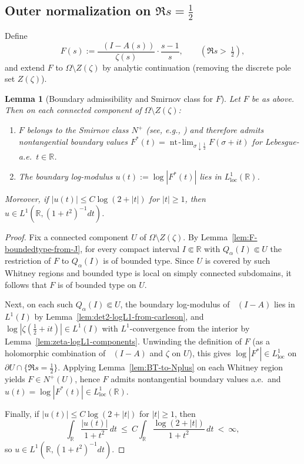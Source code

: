 \documentclass[11pt]{amsart}
\newtheorem{lemma}[theorem]{Lemma}
\theoremstyle{definition}
\theoremstyle{remark}
\DeclareMathOperator{\dettwo}{det_2}
\DeclareMathOperator{\ntlim}{nt\!-\!lim}
\begin{document}
\subsection*{Outer normalization on $\Re s=\tfrac12$}
Define
\[
  F(s):=\frac{\dettwo(I-A(s))}{\zeta(s)}\cdot\frac{s-1}{s},\qquad (\Re s>\>\tfrac12),
\]
and extend $F$ to $\Omega\setminus Z(\zeta)$ by analytic continuation (removing the discrete pole set $Z(\zeta)$).
\begin{lemma}[Boundary admissibility and Smirnov class for $F$]\label{lem:F-boundary-admissible}
Let $F$ be as above. Then on each connected component of $\Omega\setminus Z(\zeta)$:
\begin{enumerate}
\item $F$ belongs to the Smirnov class $N^+$ (see, e.g., \cite[Ch.~10]{DurenHp}) and therefore admits nontangential boundary values
$F^*(t)=\ntlim_{\sigma\downarrow \tfrac12}F(\sigma+it)$ for Lebesgue-a.e.\ $t\in\mathbb R$.
\item The boundary log-modulus $u(t):=\log|F^*(t)|$ lies in $L^1_{\mathrm{loc}}(\mathbb R)$.
\end{enumerate}
Moreover, if $|u(t)|\le C\log(2+|t|)$ for $|t|\ge 1$, then $u\in L^1(\mathbb R,(1+t^2)^{-1}dt)$.
\end{lemma}
\begin{proof}
Fix a connected component $U$ of $\Omega\setminus Z(\zeta)$. By Lemma~\ref{lem:F-boundedtype-from-J}, for every compact interval
$I\Subset\mathbb R$ with $Q_\alpha(I)\Subset U$ the restriction of $F$ to $Q_\alpha(I)$ is of bounded type.
Since $U$ is covered by such Whitney regions and bounded type is local on simply connected subdomains, it follows that $F$ is of bounded type on $U$.

Next, on each such $Q_\alpha(I)\Subset U$, the boundary log-modulus of $\dettwo(I-A)$ lies in $L^1(I)$ by Lemma~\ref{lem:det2-logL1-from-carleson},
and $\log|\zeta(\tfrac12+it)|\in L^1(I)$ with $L^1$-convergence from the interior by Lemma~\ref{lem:zeta-logL1-components}.
Unwinding the definition of $F$ (as a holomorphic combination of $\dettwo(I-A)$ and $\zeta$ on $U$), this gives $\log|F^*|\in L^1_{\mathrm{loc}}$ on $\partial U\cap\{\Re s=\tfrac12\}$.
Applying Lemma~\ref{lem:BT-to-Nplus} on each Whitney region yields $F\in N^+(U)$, hence $F$ admits nontangential boundary values a.e.\ and
$u(t)=\log|F^*(t)|\in L^1_{\mathrm{loc}}(\mathbb R)$.

Finally, if $|u(t)|\le C\log(2+|t|)$ for $|t|\ge 1$, then
\[
\int_{\mathbb R}\frac{|u(t)|}{1+t^2}\,dt \ \le\ C\int_{\mathbb R}\frac{\log(2+|t|)}{1+t^2}\,dt \ <\ \infty,
\]
so $u\in L^1(\mathbb R,(1+t^2)^{-1}dt)$.
\end{proof}
\end{document}
